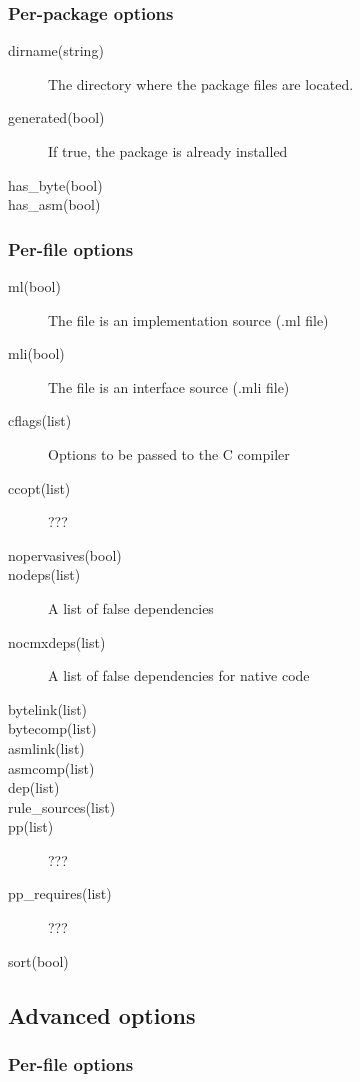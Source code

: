 \subsubsection{Per-package options}

\begin{description}
\item[dirname(string)] The directory where the package files are located.
\item[generated(bool)] If true, the package is already installed
\item[has\_byte(bool)]
\item[has\_asm(bool)]
\end{description}

\subsubsection{Per-file options}


\begin{description}
\item[ml(bool)] The file is an implementation source (.ml file)
\item[mli(bool)] The file is an interface source (.mli file)
\item[cflags(list)] Options to be passed to the C compiler
\item[ccopt(list)] ???
\item[nopervasives(bool)]
\item[nodeps(list)] A list of false dependencies
\item[nocmxdeps(list)] A list of false dependencies for native code
\item[bytelink(list)]
\item[bytecomp(list)]
\item[asmlink(list)]
\item[asmcomp(list)]
\item[dep(list)]
\item[rule\_sources(list)]
\item[pp(list)] ???
\item[pp\_requires(list)] ???
\item[sort(bool)]
\end{description}


\subsection{Advanced options}

\subsubsection{Per-file options}

